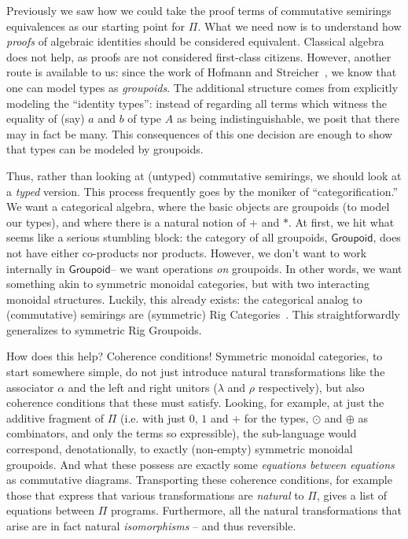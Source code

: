 \documentclass{article}
\newcommand{\Gpd}{\ensuremath{\mathsf{Groupoid}}}
\begin{document}
Previously we saw how we could take the proof terms of commutative semirings
equivalences as our starting point for $\Pi$. What we need
now is to understand how \emph{proofs} of algebraic identities should be
considered equivalent. Classical algebra does not help, as proofs
are not considered first-class citizens. However,
another route is available to us: since the work of 
Hofmann and Streicher~\cite{hofmann96thegroupoid}, we know that
one can model types as \emph{groupoids}.  The additional
structure comes from explicitly modeling the ``identity
types'': instead of regarding all terms which witness
the equality of (say) $a$ and $b$ of type $A$ as being
indistinguishable, we posit that there may in fact be many.
This consequences of this one decision are enough to show that
types can be modeled by groupoids.

Thus, rather than looking at (untyped) commutative semirings,
we should look at a \emph{typed} version. This process frequently
goes by the moniker of ``categorification.''  We want a categorical
algebra, where the basic objects are groupoids (to model our types),
and where there is a natural notion of $+$ and $*$.  At first,
we hit what seems like a serious stumbling block: the category of
all groupoids, \Gpd, does not have either co-products 
nor products. However, we don't want to work internally in
\Gpd -- we want operations
\emph{on} groupoids. In other words, we want something akin to
symmetric monoidal categories, but with two interacting 
monoidal structures.  Luckily, this already exists: the categorical
analog to (commutative) semirings are (symmetric) Rig
Categories~\cite{laplaza72,kelly74}.
This straightforwardly generalizes to symmetric Rig Groupoids.

How does this help? Coherence conditions! Symmetric monoidal categories,
to start somewhere simple, do not just introduce natural transformations
like the associator $\alpha$ and the left and right unitors ($\lambda$ 
and $\rho$ respectively), but also coherence conditions that these must satisfy.
Looking, for example, at just the additive fragment of $\Pi$ (i.e. with just $0$,
$1$ and $+$ for the types, $\odot$ and $\oplus$ as combinators, and
only the terms so expressible), the sub-language would correspond,
denotationally, to exactly (non-empty) symmetric monoidal groupoids. And what
these possess are exactly some \emph{equations between equations}
as commutative diagrams.  Transporting these coherence conditions, for
example those that express that various transformations are \emph{natural}
to $\Pi$, gives a list of equations between $\Pi$ programs.
Furthermore, all the natural transformations
that arise are in fact natural \emph{isomorphisms} -- and thus
reversible.
\end{document}
